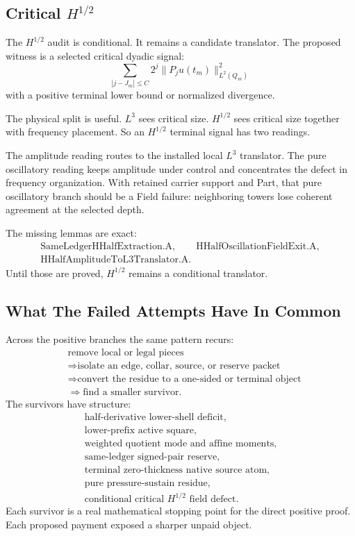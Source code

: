 \subsection{Critical \(H^{1/2}\)}

The \(H^{1/2}\) audit is conditional.
It remains a candidate translator.
The proposed witness is a selected critical dyadic signal:
\[
  \sum_{|j-J_m|\le C}
  2^j\|P_j u(t_m)\|_{L^2(Q_m)}^2
\]
with a positive terminal lower bound or normalized divergence.

The physical split is useful.
\(L^3\) sees critical size.
\(H^{1/2}\) sees critical size together with frequency placement.
So an \(H^{1/2}\) terminal signal has two readings.

The amplitude reading routes to the installed local \(L^3\) translator.
The pure oscillatory reading keeps amplitude under control and concentrates the
defect in frequency organization.
With retained carrier support and Part, that pure oscillatory branch should be a Field
failure: neighboring towers lose coherent agreement at the selected depth.

The missing lemmas are exact:
\[
  \begin{gathered}
  \text{SameLedgerHHalfExtraction.A},\qquad
  \text{HHalfOscillationFieldExit.A},\\
  \text{HHalfAmplitudeToL3Translator.A}.
  \end{gathered}
\]
Until those are proved, \(H^{1/2}\) remains a conditional translator.

\subsection{What The Failed Attempts Have In Common}

Across the positive branches the same pattern recurs:
\[
  \begin{aligned}
  &\text{remove local or legal pieces}\\
  &\Longrightarrow
  \text{isolate an edge, collar, source, or reserve packet}\\
  &\Longrightarrow
  \text{convert the residue to a one-sided or terminal object}\\
  &\Longrightarrow
  \text{find a smaller survivor}.
  \end{aligned}
\]
The survivors have structure:
\[
  \begin{gathered}
  \text{half-derivative lower-shell deficit},\\
  \text{lower-prefix active square},\\
  \text{weighted quotient mode and affine moments},\\
  \text{same-ledger signed-pair reserve},\\
  \text{terminal zero-thickness native source atom},\\
  \text{pure pressure-sustain residue},\\
  \text{conditional critical }H^{1/2}\text{ field defect}.
  \end{gathered}
\]
Each survivor is a real mathematical stopping point for the direct positive
proof.
Each proposed payment exposed a sharper unpaid object.

